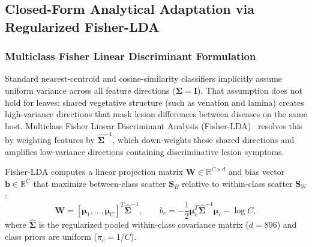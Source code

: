 \documentclass[preprint,12pt]{elsarticle}
\begin{document}
\subsection{Closed-Form Analytical Adaptation via Regularized Fisher-LDA}
\label{sec:fisher_adaptation}

\subsubsection{Multiclass Fisher Linear Discriminant Formulation}
Standard nearest-centroid and cosine-similarity classifiers implicitly assume uniform variance across all feature directions ($\mathbf{\Sigma} = \mathbf{I}$). That assumption does not hold for leaves: shared vegetative structure (such as venation and lamina) creates high-variance directions that mask lesion differences between diseases on the same host. Multiclass Fisher Linear Discriminant Analysis (Fisher-LDA)~\cite{fisher1936use, rao1948utilization} resolves this by weighting features by $\hat{\mathbf{\Sigma}}^{-1}$, which down-weights those shared directions and amplifies low-variance directions containing discriminative lesion symptoms.

Fisher-LDA computes a linear projection matrix $\mathbf{W} \in \mathbb{R}^{C \times d}$ and bias vector $\mathbf{b} \in \mathbb{R}^C$ that maximize between-class scatter $\mathbf{S}_B$ relative to within-class scatter $\mathbf{S}_W$:
\begin{equation}
    \label{eq:fisher_weights}
    \mathbf{W} = [\boldsymbol{\mu}_1, \dots, \boldsymbol{\mu}_C]^T \hat{\mathbf{\Sigma}}^{-1}, \qquad
    b_c = -\frac{1}{2}\boldsymbol{\mu}_c^T \hat{\mathbf{\Sigma}}^{-1}\boldsymbol{\mu}_c - \log C,
\end{equation}
where $\hat{\mathbf{\Sigma}}$ is the regularized pooled within-class covariance matrix ($d = 896$) and class priors are uniform ($\pi_c = 1/C$).
\end{document}
